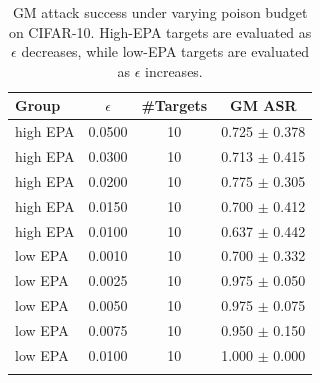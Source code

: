 \begin{table}[t]
\centering
\begin{tabular}{lccc}
\toprule
Group & $\epsilon$ & \#Targets & GM ASR \\
\midrule
high EPA & 0.0500 & 10 & 0.725 $\pm$ 0.378 \\
high EPA & 0.0300 & 10 & 0.713 $\pm$ 0.415 \\
high EPA & 0.0200 & 10 & 0.775 $\pm$ 0.305 \\
high EPA & 0.0150 & 10 & 0.700 $\pm$ 0.412 \\
high EPA & 0.0100 & 10 & 0.637 $\pm$ 0.442 \\
low EPA & 0.0010 & 10 & 0.700 $\pm$ 0.332 \\
low EPA & 0.0025 & 10 & 0.975 $\pm$ 0.050 \\
low EPA & 0.0050 & 10 & 0.975 $\pm$ 0.075 \\
low EPA & 0.0075 & 10 & 0.950 $\pm$ 0.150 \\
low EPA & 0.0100 & 10 & 1.000 $\pm$ 0.000 \\
\bottomrule
\caption{GM attack success under varying poison budget on CIFAR-10. High-EPA targets are evaluated as $\epsilon$ decreases, while low-EPA targets are evaluated as $\epsilon$ increases.}
\label{tab:cifar10_epa_epsilon_sweep}
\end{tabular}
\end{table}
